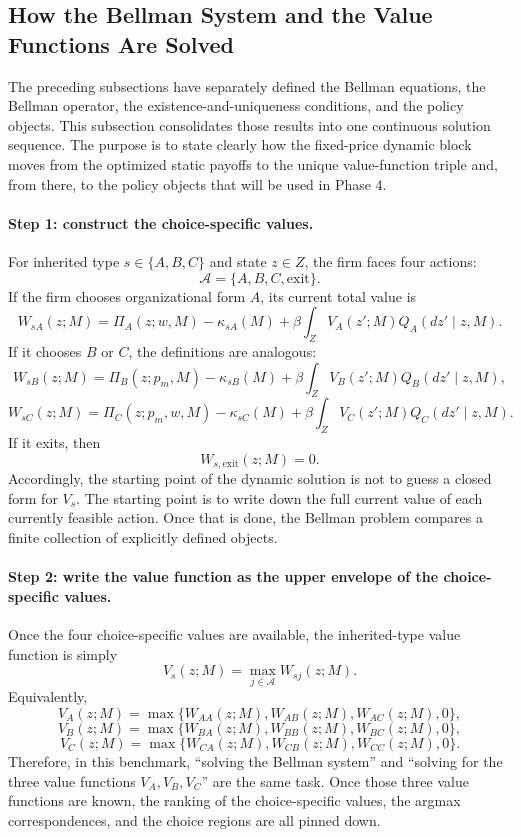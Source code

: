 \subsection{How the Bellman System and the Value Functions Are Solved}

The preceding subsections have separately defined the Bellman equations, the Bellman operator, the existence-and-uniqueness conditions, and the policy objects. This subsection consolidates those results into one continuous solution sequence. The purpose is to state clearly how the fixed-price dynamic block moves from the optimized static payoffs to the unique value-function triple and, from there, to the policy objects that will be used in Phase 4.

\paragraph{Step 1: construct the choice-specific values.}
For inherited type $s\in\{A,B,C\}$ and state $z\in Z$, the firm faces four actions:
\[
\mathcal A=\{A,B,C,\mathrm{exit}\}.
\]
If the firm chooses organizational form $A$, its current total value is
\[
W_{sA}(z;M)
=
\Pi_A(z;w,M)-\kappa_{sA}(M)+\beta\int_Z V_A(z';M)Q_A(dz'\mid z,M).
\]
If it chooses $B$ or $C$, the definitions are analogous:
\[
W_{sB}(z;M)
=
\Pi_B(z;p_m,M)-\kappa_{sB}(M)+\beta\int_Z V_B(z';M)Q_B(dz'\mid z,M),
\]
\[
W_{sC}(z;M)
=
\Pi_C(z;p_m,w,M)-\kappa_{sC}(M)+\beta\int_Z V_C(z';M)Q_C(dz'\mid z,M).
\]
If it exits, then
\[
W_{s,\mathrm{exit}}(z;M)=0.
\]
Accordingly, the starting point of the dynamic solution is not to guess a closed form for $V_s$. The starting point is to write down the full current value of each currently feasible action. Once that is done, the Bellman problem compares a finite collection of explicitly defined objects.

\paragraph{Step 2: write the value function as the upper envelope of the choice-specific values.}
Once the four choice-specific values are available, the inherited-type value function is simply
\[
V_s(z;M)=\max_{j\in\mathcal A}W_{sj}(z;M).
\]
Equivalently,
\[
V_A(z;M)=\max\{W_{AA}(z;M),W_{AB}(z;M),W_{AC}(z;M),0\},
\]
\[
V_B(z;M)=\max\{W_{BA}(z;M),W_{BB}(z;M),W_{BC}(z;M),0\},
\]
\[
V_C(z;M)=\max\{W_{CA}(z;M),W_{CB}(z;M),W_{CC}(z;M),0\}.
\]
Therefore, in this benchmark, ``solving the Bellman system'' and ``solving for the three value functions $V_A,V_B,V_C$'' are the same task. Once those three value functions are known, the ranking of the choice-specific values, the argmax correspondences, and the choice regions are all pinned down.

